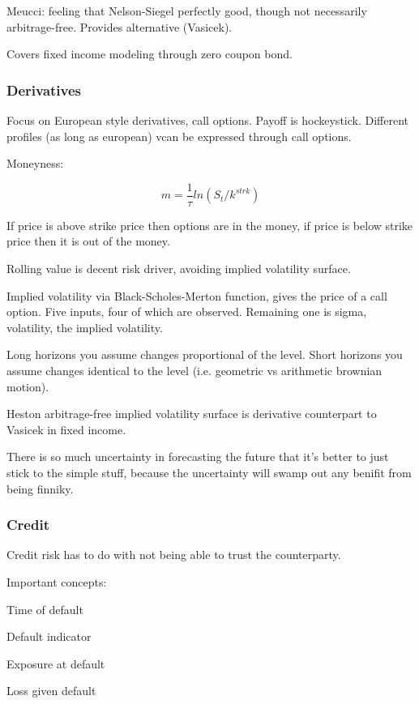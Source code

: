 Meucci: feeling that Nelson-Siegel perfectly good, though not necessarily arbitrage-free. Provides alternative (Vasicek).

Covers fixed income modeling through zero coupon bond. 

\subsubsection{Derivatives}

Focus on European style derivatives, call options. Payoff is hockeystick. Different profiles (as long as european) vcan be expressed through call options. 

Moneyness:

\begin{equation}
m = \frac{1}{\tau}ln (S_t / k^{strk})
\end{equation}

If price is above strike price then options are in the money, if price is below strike price then it is out of the money.

Rolling value is decent risk driver, avoiding implied volatility surface.

Implied volatility via Black-Scholes-Merton function, gives the price of a call option. Five inputs, four of which are observed. Remaining one is sigma, volatility, the implied volatility.

Long horizons you assume changes proportional of the level. Short horizons you assume changes identical to the level (i.e. geometric vs arithmetic brownian motion).


Heston arbitrage-free implied volatility surface is derivative counterpart to Vasicek in fixed income. 

There is so much uncertainty in forecasting the future that it's better to just stick to the simple stuff, because the uncertainty will swamp out any benifit from being finniky.  


\subsubsection{Credit}
Credit risk has to do with not being able to trust the counterparty. 

Important concepts: 

Time of default 

Default indicator

Exposure at default 

Loss given default 

